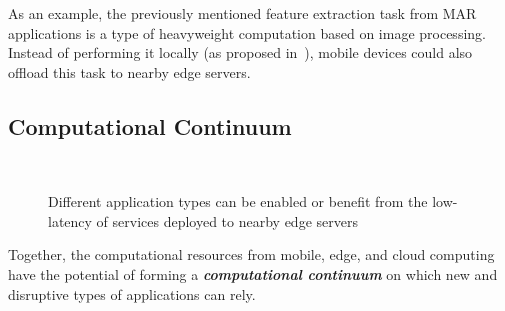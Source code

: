 
As an example, the previously mentioned feature extraction task from MAR applications is a type of heavyweight computation based on image processing. Instead of performing it locally (as proposed in~\cite{}), mobile devices could also offload this task to nearby edge servers. 

\subsection{Computational Continuum}

\begin{figure}[htbp]
	\centering
	\hfill
	~
	\hfill
	\caption{Different application types can be enabled or benefit from the low-latency of services deployed to nearby edge servers} \label{fig:motivational-cases}
\end{figure}

Together, the computational resources from mobile, edge, and cloud computing have the potential of forming a \textit{\textbf{computational continuum}} on which new and disruptive types of applications can rely. 

